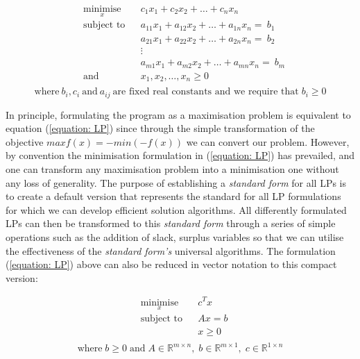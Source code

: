 \vspace{\baselineskip}

\begin{equation}
\begin{aligned}
\label{equation: LP}
& \underset{x}{\text{minimise}}
& & c_{1}x_{1}+ c_{2}x_{2}+ \ldots + c_{n}x_{n} \\
& \text{subject to}
& & a_{11}x_{1}+ a_{12}x_{2}+ \ldots + a_{1n}x_{n}=~ b_{1}\\
& & & a_{21}x_{1}+ a_{22}x_{2}+ \ldots + a_{2n}x_{n}=~ b_{2}\\
& & & \vdots\\
& & & a_{m1}x_{1}+ a_{m2}x_{2}+ \ldots + a_{mn}x_{n}=~ b_{m}\\
& \text{and}
& & x_{1},x_{2}, \ldots ,x_{n} \geq 0\\
\end{aligned}
\end{equation}
\[\text{where}~b_{i},c_{i}~\text{and}~a_{ij}~  \text{are fixed real constants and we require that} \; b_{i} \geq 0\]

\vspace{\baselineskip}
\noindent
In principle, formulating the program as a maximisation problem is equivalent to equation (\ref{equation: LP}) since through the simple transformation of the objective $maxf(x)=-min(-f(x))$ we can convert our problem. However, by convention the minimisation formulation in (\ref{equation: LP}) has prevailed, and one can transform any maximisation problem into a minimisation one without any loss of generality. The purpose of establishing a \textit{standard form} for all LPs is to create a default version that represents the standard for all LP formulations for which we can develop efficient solution algorithms. All differently formulated LPs can then be transformed to this \textit{standard form} through a series of simple operations such as the addition of slack, surplus variables so that we can utilise the effectiveness of the \textit{standard form's} universal algorithms. The formulation (\ref{equation: LP}) above can also be reduced in vector notation to this compact version:

\vspace{\baselineskip}
\begin{equation}
\label{equation: LP compact form}
\begin{aligned}
& \underset{x}{\text{minimise}}
& & c^{T}x \\
& \text{subject to}
& & Ax=b\\
& & & x \geq 0 \\
\end{aligned}
\end{equation}
\[\text{where} \; b \geq 0 \; \text{and} \; A \in \mathbb{R}^{m \times n}, \; b \in \mathbb{R}^{m \times 1}, \; c \in \mathbb{R}^{1 \times n}\]

